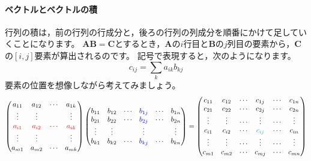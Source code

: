 \documentclass{ltjsbook}
\begin{document}
\paragraph{ベクトルとベクトルの積}
行列の積は，前の行列の行成分と，後ろの行列の列成分を順番にかけて足していくことになります。
$\bm{AB}=\bm{C}$とするとき，$\bm{A}$の$i$行目と$\bm{B}$の$j$列目の要素から，$\bm{C}$の$[i,j]$要素が算出されるのです。
記号で表現すると，次のようになります。
\[ c_{ij} = \sum_{k} a_{ik}b_{kj} \]
要素の位置を想像しながら考えてみましょう。
\[
    \begin{pmatrix}
        a_{11}                  & a_{12}                  & \cdots                  & a_{1k}                  \\
        \vdots                  & \vdots                  &                         & \vdots                  \\
        \textcolor{red}{a_{i1}} & \textcolor{red}{a_{i2}} & \textcolor{red}{\cdots} & \textcolor{red}{a_{ik}} \\
        \vdots                  & \vdots                  &                         & \vdots                  \\
        a_{m1}                  & a_{m2}                  & \cdots                  & a_{mk}
    \end{pmatrix}
    \begin{pmatrix}
        b_{11} & b_{12} & \cdots & \textcolor{blue}{b_{1j}} & \cdots & b_{1n} \\
        b_{21} & b_{22} & \cdots & \textcolor{blue}{b_{2j}} & \cdots & b_{2n} \\
        \vdots & \vdots &        & \textcolor{blue}{\vdots} &        & \vdots \\
        b_{k1} & b_{k2} & \cdots & \textcolor{blue}{b_{kj}} & \cdots & b_{kn} \\
    \end{pmatrix}
    =
    \begin{pmatrix}
        c_{11} & c_{12} & \cdots & c_{1j}                    & \cdots & c_{1n} \\
        c_{21} & c_{22} & \cdots & c_{2j}                    & \cdots & c_{2n} \\
        \vdots & \vdots & \cdots & \vdots                    & \cdots & \vdots \\
        c_{i1} & c_{i2} & \cdots & \textcolor{cyan!}{c_{ij}} & \cdots & c_{in} \\
        \vdots & \vdots & \cdots & \vdots                    & \cdots & \vdots \\
        c_{m1} & c_{m2} & \cdots & c_{mj}                    & \cdots & c_{mn} \\
    \end{pmatrix}
\]
\end{document}
